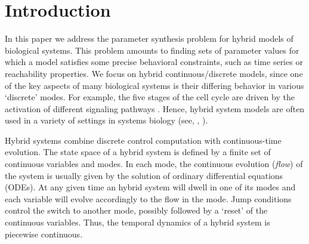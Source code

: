 \section{Introduction}


In this paper we address the parameter synthesis problem for hybrid models of biological systems.
This problem amounts to finding sets of parameter values for which a model satisfies some precise 
behavioral constraints, such as time series or reachability properties. We focus on hybrid 
continuous/discrete models, since one of the key aspects of many biological systems is their differing 
behavior in various `discrete' modes. For example, the five stages of the cell cycle are driven 
by the activation of different signaling pathways \citep{thecell}. Hence, hybrid system models are often 
used in a variety of settings in systems biology (see, \eg, 
\citep{tomlin04,Hu04,ye08,aihara10,antoniotti03,lincoln04,baldazzi11}).

Hybrid systems combine discrete control computation with continuous-time evolution. The state space 
of a hybrid system is defined by a finite set of continuous variables and modes. In each mode, the
continuous evolution ({\em flow}) of the system is usually given by the solution of ordinary differential
equations (ODEs). At any given time an hybrid system will dwell in one of its modes and each variable 
will evolve accordingly to the flow in the mode. Jump conditions control the switch to another mode,
possibly followed by a `reset' of the continuous variables. Thus, the temporal dynamics of a 
hybrid system is piecewise continuous.

